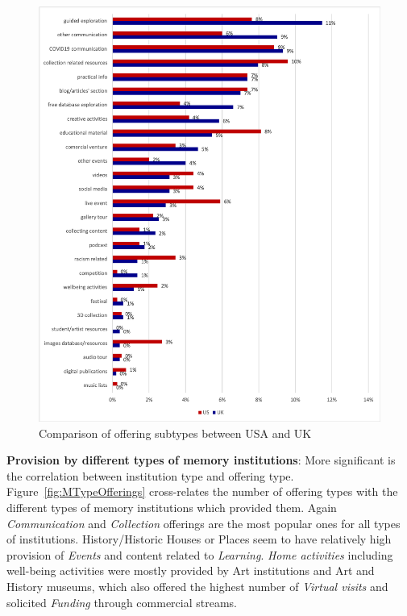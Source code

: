 \documentclass{egpubl}
\begin{document}
\begin{figure}[h]
  \centering
  \includegraphics[width=\linewidth]{images/subtypeNEW.png}
  \caption{\label{fig:SubTypeComparisonUKUS}
           Comparison of offering subtypes between USA and UK}
\end{figure}

 





\noindent \textbf{Provision by different types of memory institutions}: More significant is the correlation between institution type and offering type. Figure~\ref{fig:MTypeOfferings} cross-relates the number of offering types with the different types of memory institutions which provided them. Again \textit{Communication} and \textit{Collection} offerings are the most popular ones for all types of institutions. History/Historic Houses or Places seem to have relatively high provision of \textit{Events} and content related to \textit{Learning}. \textit{Home activities} including well-being activities were mostly provided by Art institutions and Art and History museums, which also offered the highest number of \textit{Virtual visits} and solicited \textit{Funding} through commercial streams.
\end{document}
